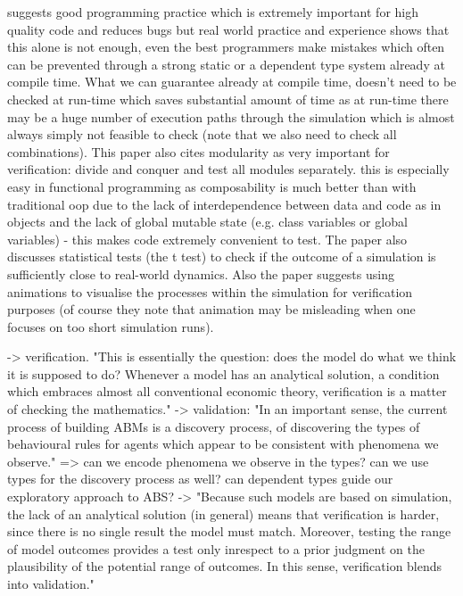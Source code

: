 \cite{kleijnen_verification_1995} suggests good programming practice which is extremely important for high quality code and reduces bugs but real world practice and experience shows that this alone is not enough, even the best programmers make mistakes which often can be prevented through a strong static or a dependent type system already at compile time. What we can guarantee already at compile time, doesn't need to be checked at run-time which saves substantial amount of time as at run-time there may be a huge number of execution paths through the simulation which is almost always simply not feasible to check (note that we also need to check all combinations). This paper also cites modularity as very important for verification: divide and conquer and test all modules separately. this is especially easy in functional programming as composability is much better than with traditional oop due to the lack of interdependence between data and code as in objects and the lack of global mutable state (e.g. class variables or global variables) - this makes code extremely convenient to test. The paper also discusses statistical tests (the t test) to check if the outcome of a simulation is sufficiently close to real-world dynamics. Also the paper suggests using animations to visualise the processes within the simulation for verification purposes (of course they note that animation may be misleading when one focuses on too short simulation runs).

\cite{ormerod_validation_2006}
	-> verification. "This is essentially the question: does the model do what we think it is supposed to do? Whenever a model has an analytical solution, a condition which embraces almost all conventional economic theory, verification is a matter of checking the mathematics."
	-> validation: "In an important sense, the current process of building ABMs is a discovery process, of discovering the types of behavioural rules for agents which appear to be consistent with phenomena we observe."
		=> can we encode phenomena we observe in the types? can we use types for the discovery process as well? can dependent types guide our exploratory approach to ABS?
	-> "Because such models are based on simulation, the lack of an analytical solution (in general) means that verification is harder, since there is no single result the model must match. Moreover, testing the range of model outcomes provides a test only inrespect to a prior judgment on the plausibility of the potential range of outcomes. In this sense, verification blends into validation."

